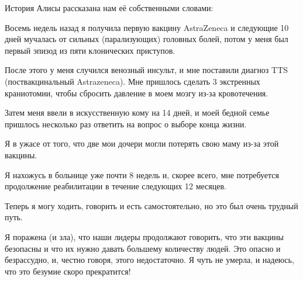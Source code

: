 История Алисы рассказана нам её собственными словами:

Восемь недель назад я получила первую вакцину AstraZeneca и следующие 10 дней
мучалась от сильных (парализующих) головных болей, потом у меня был первый
эпизод из пяти клонических приступов.

После этого у меня случился венозный инсульт, и мне поставили диагноз TTS
(поствакцинальный Astrazeneca). Мне пришлось сделать 3 экстренных краниотомии,
чтобы сбросить давление в моем мозгу из-за кровотечения.

Затем меня ввели в искусственную кому на 14 дней, и моей бедной семье пришлось
несколько раз ответить на вопрос о выборе конца жизни.

Я в ужасе от того, что две мои дочери могли потерять свою маму из-за этой
вакцины.

Я нахожусь в больнице уже почти 8 недель и, скорее всего, мне потребуется
продолжение реабилитации в течение следующих 12 месяцев.

Теперь я могу ходить, говорить и есть самостоятельно, но это был очень трудный
путь.

Я поражена (и зла), что наши лидеры продолжают говорить, что эти вакцины
безопасны и что их нужно давать большему количеству людей. Это опасно и
безрассудно, и, честно говоря, этого недостаточно. Я чуть не умерла, и надеюсь,
что это безумие скоро прекратится!
